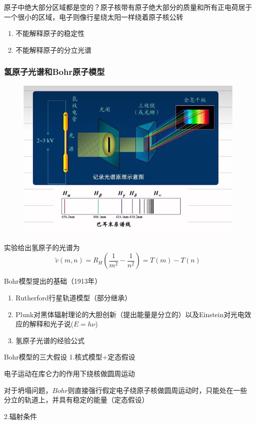 \documentclass[lang=cn,15pt]{elegantbook}
\begin{document}
原子中绝大部分区域都是空的？原子核带有原子绝大部分的质量和所有正电荷居于一个很小的区域，电子则像行星绕太阳一样绕着原子核公转

\begin{enumerate}
	\item 不能解释原子的稳定性
	\item 不能解释原子的分立光谱
\end{enumerate}
\subsubsection{氢原子光谱和Bohr原子模型}

\begin{figure}[H]
	\centering
	\includegraphics[width=0.7\linewidth]{figure/screenshot0014}
\end{figure}

实验给出氢原子的光谱为
\begin{equation}
	\tilde{v}\left( m,n \right) =R_H\left( \frac{1}{m^2}-\frac{1}{n^2} \right) =T\left( m \right) -T\left( n \right) 
\end{equation}

Bohr模型提出的基础（1913年）
\begin{enumerate}
	\item Rutherford行星轨道模型（部分继承）
	\item Plunk对黑体辐射理论的大胆创新（提出能量是分立的）以及Einstein对光电效应的解释和光子说($E=h$$\nu$)
	\item 氢原子光谱的经验公式
\end{enumerate}
Bohr模型的三大假设
1.核式模型+定态假设

电子运动在库仑力的作用下绕核做圆周运动

对于坍塌问题，$Bohr$则直接强行假定电子绕原子核做圆周运动时，只能处在一些分立的轨道上，并具有稳定的能量（定态假设）

2.辐射条件
\end{document}
